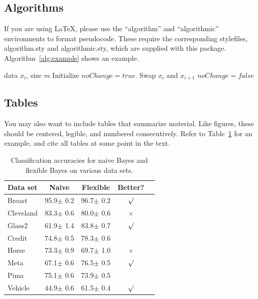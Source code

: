 \documentclass{article}
\begin{document}
\subsection{Algorithms}

If you are using \LaTeX, please use the ``algorithm'' and ``algorithmic''
environments to format pseudocode. These require
the corresponding stylefiles, algorithm.sty and
algorithmic.sty, which are supplied with this package.
Algorithm~\ref{alg:example} shows an example.

\begin{algorithm}[tb]
   \caption{Bubble Sort}
   \label{alg:example}
\begin{algorithmic}
    data $x_i$, size $m$
   \REPEAT
   \STATE Initialize $noChange = true$.
   \STATE Swap $x_i$ and $x_{i+1}$
   \STATE $noChange = false$
   \ENDIF
   \ENDFOR
\end{algorithmic}
\end{algorithm}

\subsection{Tables}

You may also want to include tables that summarize material. Like
figures, these should be centered, legible, and numbered consecutively. Refer to Table~\ref{sample-table} for an example, and cite all tables at some point in the text.

\begin{table}[t]
\caption{Classification accuracies for naive Bayes and flexible
Bayes on various data sets.}
\label{sample-table}
\vskip 0.15in
\begin{center}
\begin{small}
\begin{sc}
\begin{tabular}{lcccr}
\toprule
Data set & Naive & Flexible & Better? \\
\midrule
Breast    & 95.9$\pm$ 0.2& 96.7$\pm$ 0.2& $\surd$ \\
Cleveland & 83.3$\pm$ 0.6& 80.0$\pm$ 0.6& $\times$\\
Glass2    & 61.9$\pm$ 1.4& 83.8$\pm$ 0.7& $\surd$ \\
Credit    & 74.8$\pm$ 0.5& 78.3$\pm$ 0.6&         \\
Horse     & 73.3$\pm$ 0.9& 69.7$\pm$ 1.0& $\times$\\
Meta      & 67.1$\pm$ 0.6& 76.5$\pm$ 0.5& $\surd$ \\
Pima      & 75.1$\pm$ 0.6& 73.9$\pm$ 0.5&         \\
Vehicle   & 44.9$\pm$ 0.6& 61.5$\pm$ 0.4& $\surd$ \\
\bottomrule
\end{tabular}
\end{sc}
\end{small}
\end{center}
\vskip -0.1in
\end{table}
\end{document}
